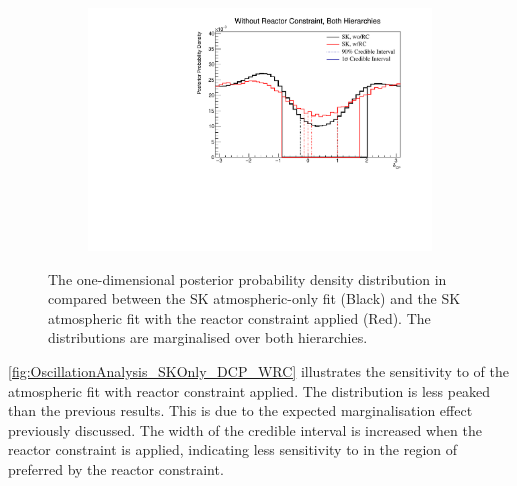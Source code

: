 \begin{figure}[h]
  \begin{subfigure}[t]{0.98\textwidth}
    \includegraphics[width=\textwidth, trim={0mm 0mm 0mm 0mm}, clip,page=1]{Figures/OA/SKOnlyFit_wRC/ContourComparison_1D_dcp_BH_2_wRC_woRC_UnSmeared_CredibleInterval.pdf}
  \end{subfigure}
  \caption{The one-dimensional posterior probability density distribution in  compared between the SK atmospheric-only fit (Black) and the SK atmospheric fit with the reactor constraint applied (Red). The distributions are marginalised over both hierarchies.}
  \label{fig:OscillationAnalysis_SKOnly_DCP_WRC}
\end{figure}

\autoref{fig:OscillationAnalysis_SKOnly_DCP_WRC} illustrates the sensitivity to  of the atmospheric fit with reactor constraint applied. The distribution is less peaked than the previous results. This is due to the expected marginalisation effect previously discussed. The width of the \quickmath{1\sigma} credible interval is increased when the reactor constraint is applied, indicating less sensitivity to  in the region of  preferred by the reactor constraint.

